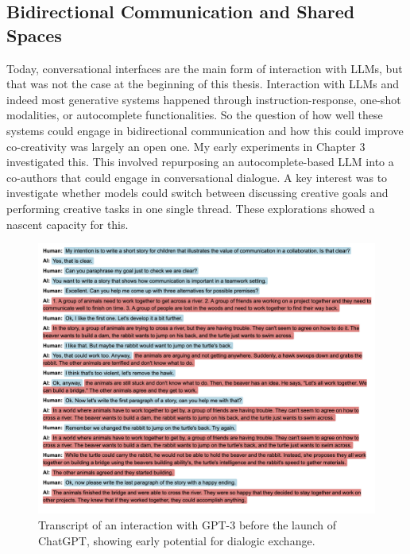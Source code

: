 \subsection{Bidirectional Communication and Shared Spaces}
Today, conversational interfaces are the main form of interaction with LLMs, but that was not the case at the beginning of this thesis. Interaction with LLMs and indeed most generative systems happened through instruction-response, one-shot modalities, or autocomplete functionalities. So the question of how well these systems could engage in bidirectional communication and how this could improve co-creativity was largely an open one.  My early experiments in Chapter 3 investigated this. This involved repurposing an autocomplete-based LLM into a co-authors that could engage in conversational dialogue. A key interest was to investigate whether models could switch between discussing creative goals and performing creative tasks in one single thread. These explorations showed a nascent capacity for this.


\begin{figure}[H]
    \centering
    \includegraphics[width=1\linewidth]{transcriptgenchi.png}
    \caption{Transcript of an interaction with GPT-3 before the launch of ChatGPT, showing early potential for dialogic exchange.}
    \label{fig:genchi_transcript}
\end{figure}

